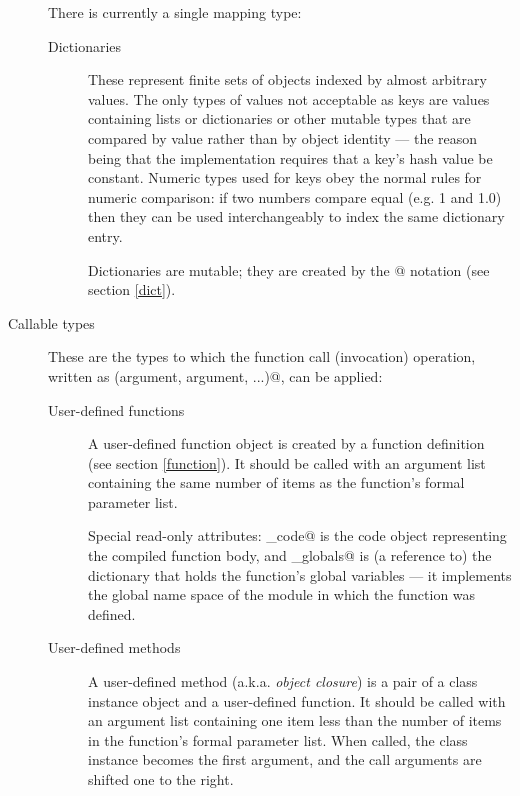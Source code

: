 \begin{description}
There is currently a single mapping type:

\begin{description}

\item[Dictionaries]
These represent finite sets of objects indexed by almost arbitrary
values.  The only types of values not acceptable as keys are values
containing lists or dictionaries or other mutable types that are
compared by value rather than by object identity --- the reason being
that the implementation requires that a key's hash value be constant.
Numeric types used for keys obey the normal rules for numeric
comparison: if two numbers compare equal (e.g. 1 and 1.0) then they
can be used interchangeably to index the same dictionary entry.

Dictionaries are mutable; they are created by the @
notation (see section \ref{dict}).

\end{description} %

\item[Callable types]
These are the types to which the function call (invocation) operation,
written as \verb@function(argument, argument, ...)@, can be applied:

\begin{description}

\item[User-defined functions]
A user-defined function object is created by a function definition
(see section \ref{function}).  It should be called with an argument
list containing the same number of items as the function's formal
parameter list.

Special read-only attributes: \verb@func_code@ is the code object
representing the compiled function body, and \verb@func_globals@ is (a
reference to) the dictionary that holds the function's global
variables --- it implements the global name space of the module in
which the function was defined.

\item[User-defined methods]
A user-defined method (a.k.a. {\em object closure}) is a pair of a
class instance object and a user-defined function.  It should be
called with an argument list containing one item less than the number
of items in the function's formal parameter list.  When called, the
class instance becomes the first argument, and the call arguments are
shifted one to the right.


\end{description}
\end{description}
